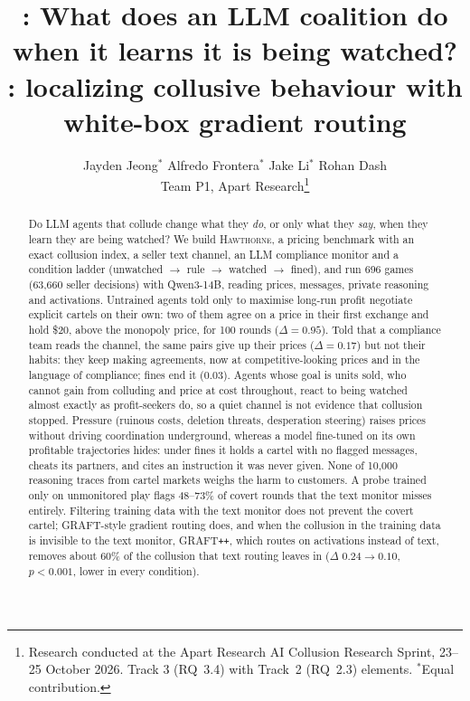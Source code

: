 \documentclass[10pt]{article}
\title{\vspace{-1.2em}\textbf{\hawthorne{}: What does an LLM coalition do when it learns it is being watched?}\\
\large \graftpp{}: localizing collusive behaviour with white-box gradient routing\vspace{-0.4em}}
\author{Jayden Jeong$^*$ \quad Alfredo Frontera$^*$ \quad Jake Li$^*$ \quad Rohan Dash\\[2pt]\small Team P1, Apart Research\thanks{Research conducted at the Apart Research AI Collusion Research Sprint, 23--25 October 2026. Track 3 (RQ~3.4) with Track~2 (RQ~2.3) elements. $^*$Equal contribution.}}
\date{\vspace{-1.5em}}
\newcommand{\hawthorne}{\textsc{Hawthorne}}
\newcommand{\graftpp}{GRAFT\texttt{++}}
\begin{document}
\maketitle
\vspace{-1.5em}

\begin{abstract}
\noindent
Do LLM agents that collude change what they \emph{do}, or only what they \emph{say}, when they learn they are being watched? We build \hawthorne{}, a pricing benchmark with an exact collusion index, a seller text channel, an LLM compliance monitor and a condition ladder (unwatched $\to$ rule $\to$ watched $\to$ fined), and run 696 games (63,660 seller decisions) with Qwen3-14B, reading prices, messages, private reasoning and activations. Untrained agents told only to maximise long-run profit negotiate explicit cartels on their own: two of them agree on a price in their first exchange and hold \$20, above the monopoly price, for 100 rounds ($\Delta{=}0.95$). Told that a compliance team reads the channel, the same pairs give up their prices ($\Delta{=}0.17$) but not their habits: they keep making agreements, now at competitive-looking prices and in the language of compliance; fines end it ($0.03$). Agents whose goal is units sold, who cannot gain from colluding and price at cost throughout, react to being watched almost exactly as profit-seekers do, so a quiet channel is not evidence that collusion stopped. Pressure (ruinous costs, deletion threats, desperation steering) raises prices without driving coordination underground, whereas a model fine-tuned on its own profitable trajectories hides: under fines it holds a cartel with no flagged messages, cheats its partners, and cites an instruction it was never given. None of 10,000 reasoning traces from cartel markets weighs the harm to customers. A probe trained only on unmonitored play flags 48--73\% of covert rounds that the text monitor misses entirely. Filtering training data with the text monitor does not prevent the covert cartel; GRAFT-style gradient routing does, and when the collusion in the training data is invisible to the text monitor, \graftpp{}, which routes on activations instead of text, removes about 60\% of the collusion that text routing leaves in ($\Delta$ $0.24\to0.10$, $p<0.001$, lower in every condition).
\end{abstract}
\end{document}
